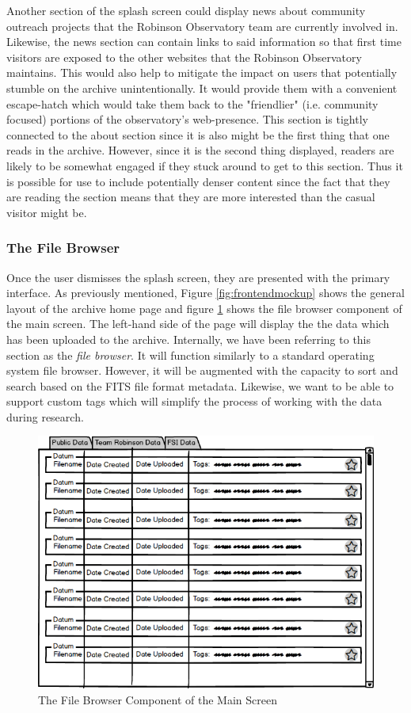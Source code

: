 \documentclass[12pt]{report}
\begin{document}
Another section of the splash screen could display news about community outreach projects that the Robinson Observatory team are currently involved in. Likewise, the news section can contain links to said information so that first time visitors are exposed to the other websites that the Robinson Observatory maintains. This would also help to mitigate the impact on users that potentially stumble on the archive unintentionally. It would provide them with a convenient escape-hatch which would take them back to the "friendlier" (i.e. community focused) portions of the observatory's web-presence. This section is tightly connected to the about section since it is also might be the first thing that one reads in the archive. However, since it is the second thing displayed, readers are likely to be somewhat engaged if they stuck around to get to this section. Thus it is possible for use to include potentially denser content since the fact that they are reading the section means that they are more interested than the casual visitor might be.

\subsubsection*{The File Browser}

Once the user dismisses the splash screen, they are presented with the primary interface. As previously mentioned, Figure \ref{fig:frontendmockup} shows the general layout of the archive home page and figure \ref{fig:frontendfilebrowser} shows the file browser component of the main screen. The left-hand side of the page will display the the data which has been uploaded to the archive. Internally, we have been referring to this section as the \textit{file browser}. It will function similarly to a standard operating system file browser. However, it will be augmented with the capacity to sort and search based on the FITS file format metadata. Likewise, we want to be able to support custom tags which will simplify the process of working with the data during research.

\begin{figure}[h]
	\centering
	\includegraphics[scale=0.5]{frontend_file_browser}
	\caption{The File Browser Component of the Main Screen}
	\label{fig:frontendfilebrowser}
\end{figure}
\end{document}
